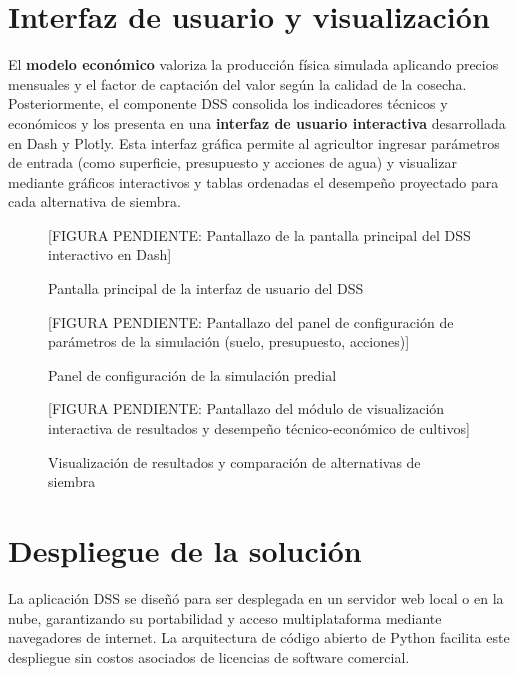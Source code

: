 \documentclass[12pt]{report}
\begin{document}
\section{Interfaz de usuario y visualización}

El \textbf{modelo económico} valoriza la producción física simulada aplicando precios mensuales y el factor de captación del valor según la calidad de la cosecha. Posteriormente, el componente DSS consolida los indicadores técnicos y económicos y los presenta en una \textbf{interfaz de usuario interactiva} desarrollada en Dash y Plotly. Esta interfaz gráfica permite al agricultor ingresar parámetros de entrada (como superficie, presupuesto y acciones de agua) y visualizar mediante gráficos interactivos y tablas ordenadas el desempeño proyectado para cada alternativa de siembra.

\begin{figure}[H]
    \centering
    \vspace{0.3cm}
    [FIGURA PENDIENTE: Pantallazo de la pantalla principal del DSS interactivo en Dash]
    \caption{Pantalla principal de la interfaz de usuario del DSS}
    \label{fig:interfaz_dss_main}
\end{figure}

\begin{figure}[H]
    \centering
    \vspace{0.3cm}
    [FIGURA PENDIENTE: Pantallazo del panel de configuración de parámetros de la simulación (suelo, presupuesto, acciones)]
    \caption{Panel de configuración de la simulación predial}
    \label{fig:interfaz_dss_config}
\end{figure}

\begin{figure}[H]
    \centering
    \vspace{0.3cm}
    [FIGURA PENDIENTE: Pantallazo del módulo de visualización interactiva de resultados y desempeño técnico-económico de cultivos]
    \caption{Visualización de resultados y comparación de alternativas de siembra}
    \label{fig:interfaz_dss_results}
\end{figure}

\section{Despliegue de la solución}

La aplicación DSS se diseñó para ser desplegada en un servidor web local o en la nube, garantizando su portabilidad y acceso multiplataforma mediante navegadores de internet. La arquitectura de código abierto de Python facilita este despliegue sin costos asociados de licencias de software comercial.
\end{document}
